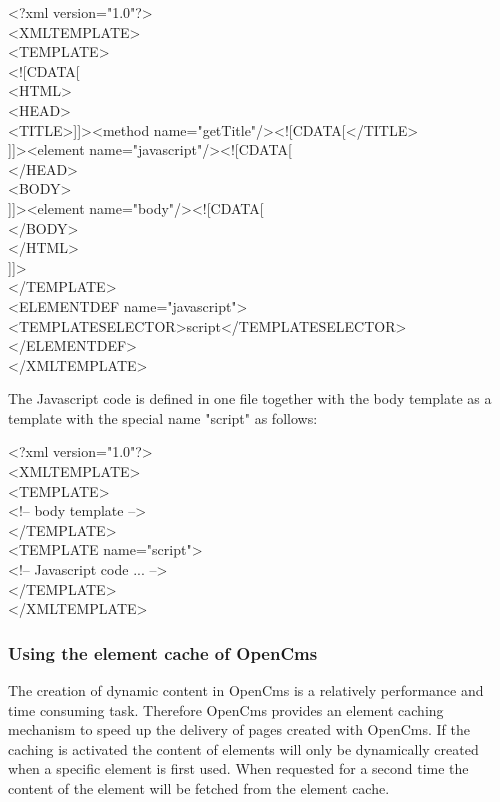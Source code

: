 \begin{xml}
<?xml version="1.0"?>\\
<XMLTEMPLATE>\\

<TEMPLATE>\\
<![CDATA[\\
<HTML>\\
<HEAD>\\
<TITLE>]]><method name="getTitle"/><![CDATA[</TITLE>\\
]]><element name="javascript"/><![CDATA[\\
</HEAD>\\
<BODY>\\
]]><element name="body"/><![CDATA[\\
</BODY>\\
</HTML>\\
]]>\\
</TEMPLATE>\\
<ELEMENTDEF name="javascript">\\
<TEMPLATESELECTOR>script</TEMPLATESELECTOR>\\
</ELEMENTDEF>\\
</XMLTEMPLATE>\\
\end{xml}

The Javascript code is defined in one file together with the body
template as a template with the special name "script" as follows:

\begin{xml}
<?xml version="1.0"?>\\
<XMLTEMPLATE>\\
<TEMPLATE>\\
<!-- body template -->\\
</TEMPLATE>\\
<TEMPLATE name="script">\\
<!-- Javascript code ... -->\\
</TEMPLATE>\\
</XMLTEMPLATE>\\
\end{xml}

\subsubsection{Using the element cache of OpenCms}
\label{element cache}
The creation of dynamic content in OpenCms is a relatively performance and
time consuming task. Therefore OpenCms provides an element caching mechanism 
to speed up the delivery of pages created with OpenCms.
If the caching is activated the content of elements will only be dynamically 
created when a specific element is first used. When requested for a second time 
the content of the element will be fetched from the element cache.

